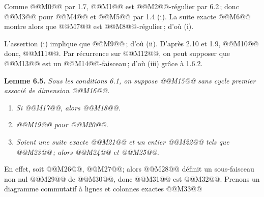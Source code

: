 
Comme @@M0@@ par 1.7, @@M1@@ est @@M2@@-r\'egulier par 6.2\,; donc @@M3@@ pour @@M4@@ et @@M5@@ par 1.4 (i). La suite exacte @@M6@@ montre alors que @@M7@@ est @@M8@@-r\'egulier\,; d'o\`u (i).

L'assertion (i) implique que @@M9@@\,; d'o\`u (ii). D'apr\`es 2.10 et 1.9,
@@M10@@
donc, @@M11@@. Par r\'ecurrence sur @@M12@@, on peut supposer que @@M13@@ est un @@M14@@-faisceau\,; d'o\`u (iii) gr\^ace \`a 1.6.2.

\textbf{Lemme 6.5.} \emph{Sous les conditions 6.1, on suppose @@M15@@ sans cycle premier associ\'e de dimension @@M16@@.}
\begin{enumerate}[label=(\roman*)]
\item \emph{Si @@M17@@, alors @@M18@@.}
\item \emph{@@M19@@ pour @@M20@@.}
\item \emph{Soient une suite exacte @@M21@@ et un entier @@M22@@ tels que @@M23@@\,; alors @@M24@@ et @@M25@@.}
\end{enumerate}
En effet, soit @@M26@@, @@M27@@; alors @@M28@@ d\'efinit un sous-faisceau non nul @@M29@@ de @@M30@@, donc @@M31@@ est @@M32@@. Prenons un diagramme commutatif \`a lignes et colonnes exactes
@@M33@@
